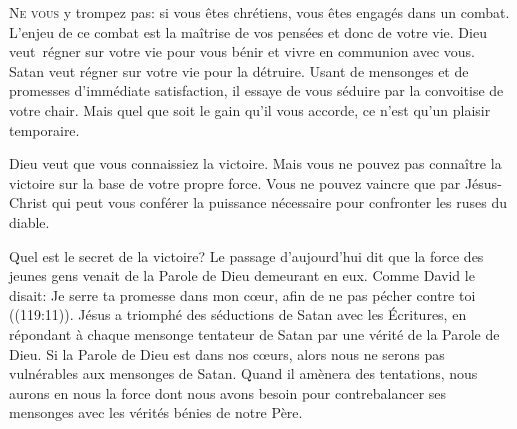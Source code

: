 




\lettrine{N}{e vous} y trompez pas: si vous êtes chrétiens,
 vous êtes engagés dans un combat. L'enjeu de ce combat est la maîtrise
 de vos pensées et donc de votre vie.
 Dieu veut~régner sur votre vie
 pour vous bénir et vivre en communion avec vous.
 Satan veut régner sur votre vie pour la détruire.
 Usant de mensonges et de promesses d'immédiate satisfaction,
 il essaye de vous séduire par la convoitise de votre chair.
 Mais quel que soit le gain qu'il vous accorde,
 ce n'est qu'un plaisir temporaire.


Dieu veut que vous connaissiez la victoire. Mais vous ne pouvez pas connaître
 la victoire sur la base de votre propre force. Vous ne pouvez vaincre
 que par Jésus-Christ qui peut vous conférer la puissance nécessaire pour
 confronter les ruses du diable.

Quel est le secret de la victoire? Le passage d'aujourd'hui dit que la force
 des jeunes gens venait de la Parole de Dieu demeurant en eux.
 Comme David le disait: 
 \Og Je serre ta promesse dans mon c\oe{}ur, afin de ne pas pécher contre toi \Fg{}
 ((119:11)).
 Jésus a triomphé des séductions de Satan avec les Écritures, en répondant
 à chaque mensonge tentateur de Satan par une vérité de la Parole de Dieu.
 Si la Parole de Dieu est dans nos c\oe{}urs, alors nous ne serons pas
 vulnérables aux mensonges de Satan.
 Quand il amènera des tentations, nous aurons en nous la force dont nous
 avons besoin pour contrebalancer ses mensonges avec les vérités bénies 
 de notre Père.


\dvrule






